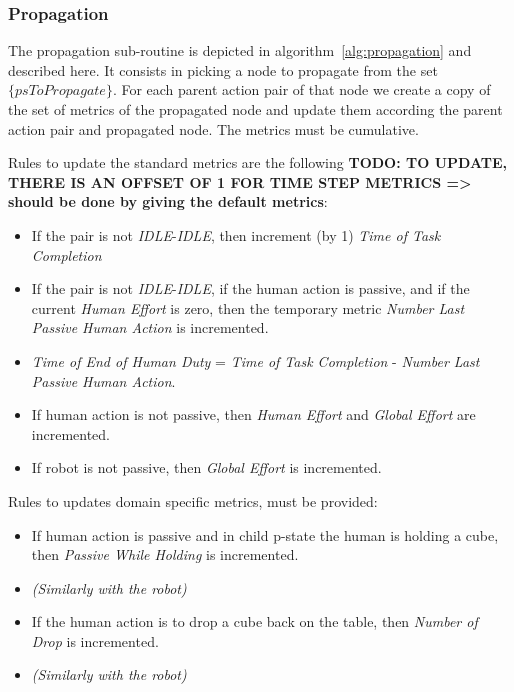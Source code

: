     \subsubsection{Propagation}

The propagation sub-routine is depicted in algorithm~\ref{alg:propagation} and described here. It consists in picking a node to propagate from the set $\{psToPropagate\}$. For each parent action pair of that node we create a copy of the set of metrics of the propagated node and update them according the parent action pair and propagated node. 
The metrics must be cumulative. 

Rules to update the standard metrics are the following \textbf{TODO: TO UPDATE, THERE IS AN OFFSET OF 1 FOR TIME STEP METRICS => should be done by giving the default metrics}:
\vspace{-\topsep}
\begin{itemize}
    \setlength\itemsep{-0.3em}
    \item If the pair is not \textit{IDLE}-\textit{IDLE}, then increment (by 1) \textit{Time of Task Completion}
    \item If the pair is not \textit{IDLE}-\textit{IDLE}, if the human action is passive, and if the current \textit{Human Effort} is zero, then the temporary metric \textit{Number Last Passive Human Action} is incremented.
    \item \textit{Time of End of Human Duty} = \textit{Time of Task Completion} - \textit{Number Last Passive Human Action}.
    \item If human action is not passive, then \textit{Human Effort} and \textit{Global Effort} are incremented.
    \item If robot is not passive, then \textit{Global Effort} is incremented.
\end{itemize}
Rules to updates domain specific metrics, must be provided:
\vspace{-\topsep}
\begin{itemize}
    \setlength\itemsep{-0.3em}
    \item If human action is passive and in child p-state the human is holding a cube, then \textit{Passive While Holding} is incremented.
    \item \textit{(Similarly with the robot)}
    \item If the human action is to drop a cube back on the table, then \textit{Number of Drop} is incremented.
    \item \textit{(Similarly with the robot)}
\end{itemize}

